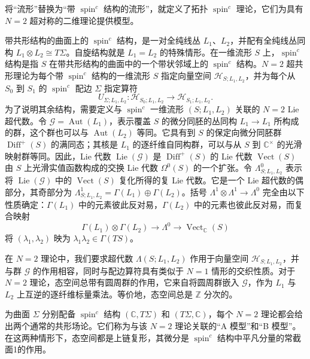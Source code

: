 \begin{example}\label{ex:2.4}
将“流形”替换为“带 $\operatorname{spin}^c$ 结构的流形”，就定义了拓扑 $\operatorname{spin}^c$ 理论，它们为具有 $N=2$ 超对称的二维理论提供模型。

带共形结构的曲面上的 $\operatorname{spin}^c$ 结构，是一对全纯线丛 $L_1$、$L_2$，并配有全纯线丛同构 $L_1\otimes L_2\cong T\Sigma$。自旋结构就是 $L_1=L_2$ 的特殊情形。在一维流形 $S$ 上，$\operatorname{spin}^c$ 结构是指 $S$ 在带共形结构的曲面中的一个带状邻域上的 $\operatorname{spin}^c$ 结构。$N=2$ 超共形理论为每个带 $\operatorname{spin}^c$ 结构的一维流形 $S$ 指定向量空间 $\mathcal{H}_{S;L_1,L_2}$，并为每个从 $S_0$ 到 $S_1$ 的 $\operatorname{spin}^c$ 配边 $\Sigma$ 指定算符
\begin{equation}\label{eq:2.23}
U_{\Sigma;L_1,L_2}\colon\mathcal{H}_{S_0;L_1,L_2}\longrightarrow\mathcal{H}_{S_1;L_1,L_2}.
\end{equation}
为了说明其余结构，需要定义与 $\operatorname{spin}^c$ 一维流形 $(S;L_1,L_2)$ 关联的 $N=2$ Lie 超代数。令 $\mathcal{G}=\operatorname{Aut}(L_1)$，表示覆盖 $S$ 的微分同胚的丛同构 $L_1\to L_1$ 所构成的群，这个群也可以与 $\operatorname{Aut}(L_2)$ 等同。它具有到 $S$ 的保定向微分同胚群 $\operatorname{Diff}^+(S)$ 的满同态；其核是 $L_1$ 的逐纤维自同构群，可以与从 $S$ 到 $\mathbb{C}^\times$ 的光滑映射群等同。因此，Lie 代数 $\operatorname{Lie}(\mathcal{G})$ 是 $\operatorname{Diff}^+(S)$ 的 Lie 代数 $\operatorname{Vect}(S)$ 由 $S$ 上光滑实值函数构成的交换 Lie 代数 $\Omega^0(S)$ 的一个扩张。令 $\Lambda^0_{S;L_1,L_2}$ 表示将 $\operatorname{Lie}(\mathcal{G})$ 中的 $\operatorname{Vect}(S)$ 复化所得的复 Lie 代数。它是一个 Lie 超代数的偶部分，其奇部分为 $\Lambda^1_{S;L_1,L_2}=\Gamma(L_1)\oplus\Gamma(L_2)$。括号 $\Lambda^1\otimes\Lambda^1\to\Lambda^0$ 完全由以下性质确定：$\Gamma(L_1)$ 中的元素彼此反对易，$\Gamma(L_2)$ 中的元素也彼此反对易，而复合映射
\begin{equation}\label{eq:2.24}
\Gamma(L_1)\otimes\Gamma(L_2)\longrightarrow\Lambda^0\longrightarrow\operatorname{Vect}_{\mathbb{C}}(S)
\end{equation}
将 $(\lambda_1,\lambda_2)$ 映为 $\lambda_1\lambda_2\in\Gamma(TS)$。

在 $N=2$ 理论中，我们要求超代数 $\Lambda(S;L_1,L_2)$ 作用于向量空间 $\mathcal{H}_{S;L_1,L_2}$，并与群 $\mathcal{G}$ 的作用相容，同时与配边算符具有类似于 $N=1$ 情形的交织性质。对于 $N=2$ 理论，态空间总带有圆周群的作用，它来自将圆周群嵌入 $\mathcal{G}$，作为 $L_1$ 与 $L_2$ 上互逆的逐纤维标量乘法。等价地，态空间总是 $\mathbb{Z}$ 分次的。

为曲面 $\Sigma$ 分别配备 $\operatorname{spin}^c$ 结构 $(\mathbb{C},T\Sigma)$ 和 $(T\Sigma,\mathbb{C})$，每个 $N=2$ 理论都会给出两个通常的共形场论。它们称为与该 $N=2$ 理论关联的“A 模型”和“B 模型”。在这两种情形下，态空间都是上链复形，其微分是 $\operatorname{spin}^c$ 结构中平凡分量的常截面1的作用。
\end{example}


